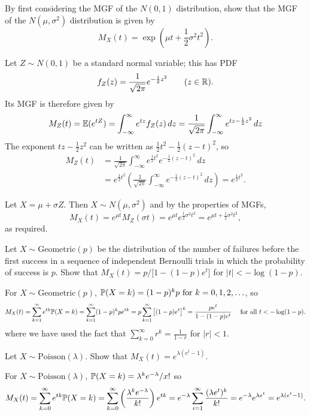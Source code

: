 \begin{example}\label{exa:mgf_normal}
By first considering the MGF of the $N(0,1)$ distribution, show that the MGF of the $N(\mu,\sigma^2)$ distribution is given by
\[
M_X(t) = \exp\left(\mu t + \frac{1}{2}\sigma^2t^2\right).
\]
\end{example}

\begin{solution}
Let $Z\sim N(0,1)$ be a standard normal variable; this has PDF
\[
f_Z(z) = \frac{1}{\sqrt{2\pi}}e^{-\frac{1}{2}z^2}\qquad (z\in\mathbb{R}).
\]
Its MGF is therefore given by
\[
M_Z(t) = \mathbb{E}(e^{tZ})
	 = \int_{-\infty}^{\infty} e^{tz} f_Z(z)\,dz 
	 = \frac{1}{\sqrt{2\pi}}\int_{-\infty}^{\infty} e^{tz-\frac{1}{2}z^2}\,dz 
\]
The exponent $tz-\frac{1}{2}z^2$ can be written as $\frac{1}{2}t^2 -\frac{1}{2}(z-t)^2$, so
\begin{align*}
M_Z(t)
	& = \frac{1}{\sqrt{2\pi}}\int_{-\infty}^{\infty} e^{\frac{1}{2}t^2} e^{-\frac{1}{2}(z-t)^2}\,dz \\
	& = e^{\frac{1}{2}t^2} \left(\frac{1}{\sqrt{2\pi}}\int_{-\infty}^{\infty} e^{-\frac{1}{2}(z-t)^2}\,dz\right) 
	= e^{\frac{1}{2}t^2}.
\end{align*}

Let $X=\mu+\sigma Z$. Then $X\sim N(\mu,\sigma^2)$ and by the properties of MGFs,
\[
M_X(t) = e^{\mu t}M_Z(\sigma t) = e^{\mu t}e^{\frac{1}{2}\sigma^2t^2}= e^{\mu t + \frac{1}{2}\sigma^2t^2},
\]
as required.
\end{solution}

\begin{exercise}
\begin{questions}

\question
Let $X\sim\text{Geometric}(p)$ be the distribution of the number of failures before the first success in a sequence of independent Bernoulli trials in which the probability of success is $p$. Show that $M_X(t) = p/\big[1-(1-p)e^t\big]$ for $|t|<-\log(1-p)$.
\begin{answer}
For $X\sim\text{Geometric}(p)$, $\mathbb{P}(X=k) = (1-p)^k p \text{ for } k=0,1,2,\ldots$, so 
\[
M_X(t)	= \sum_{k=1}^\infty e^{tk}\mathbb{P}(X=k)
		= \sum_{k=1}^\infty (1-p)^k p e^{tk}
		= p\sum_{k=1}^\infty \big[(1-p)e^t\big]^k 
		= \frac{pe^t}{1-(1-p)e^t} \quad\text{ for all } t < -\log(1-p).
\]
where we have used the fact that $\sum_{k=0}^{\infty} r^k = \frac{1}{1-r}$ for $|r|<1$.
\end{answer}

\question
Let $X\sim\text{Poisson}(\lambda)$. Show that $M_X(t) = e^{\lambda(e^t-1)}$.
\begin{answer}
For $X\sim\text{Poisson}(\lambda)$, $\mathbb{P}(X=k) = \lambda^k e^{-\lambda}/x!$ so
\[
M_X(t)	= \sum_{k=0}^\infty e^{tk}\mathbb{P}(X=k)
		= \sum_{k=0}^{\infty}\left(\frac{\lambda^k e^{-\lambda}}{k!}\right)e^{tk}
		= e^{-\lambda}\sum_{i=1}^\infty \frac{(\lambda e^t)^k}{k!}
		= e^{-\lambda}e^{\lambda e^t}
		= e^{\lambda(e^t-1)}.
\]
\end{answer}
\end{questions}
\end{exercise}

